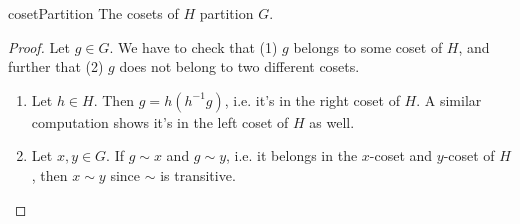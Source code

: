 \begin{proposition}{}{cosetPartition}
  The cosets of $H$ partition $G$.
  \begin{proof}
    Let $g\in G$. We have to check that (1) $g$ belongs to some coset of $H$,
    and further that (2) $g$ does not belong to two different cosets.
    \begin{enumerate}
      \item Let $h\in H$. Then $g=h(h^{-1}g)$, i.e. it's in the right
            coset of $H$. A similar computation shows it's in the left
            coset of $H$ as well. 
      \item Let $x,y\in G$. If $g\sim x$ and $g\sim y$, i.e. it belongs in
            the $x$-coset and $y$-coset of $H$, then $x\sim y$ since
            $\sim$ is transitive. 
    \end{enumerate}
  \end{proof}
\end{proposition}

